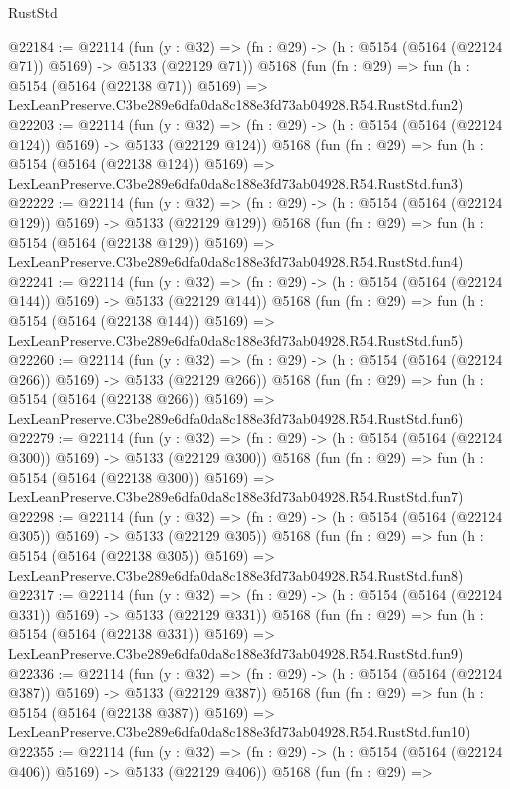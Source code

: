 \begin{lexlean}{RustStd}
\begin{coremodule}
@22184 := @22114
    (fun (y : @32) => (fn : @29) -> (h : @5154 (@5164 (@22124 @71)) @5169) -> @5133 (@22129 @71))
    @5168
    (fun (fn : @29) =>
    fun (h : @5154 (@5164 (@22138 @71)) @5169) =>
    LexLeanPreserve.C3be289e6dfa0da8c188e3fd73ab04928.R54.RustStd.fun2)
@22203 := @22114
    (fun (y : @32) => (fn : @29) -> (h : @5154 (@5164 (@22124 @124)) @5169) -> @5133 (@22129 @124))
    @5168
    (fun (fn : @29) =>
    fun (h : @5154 (@5164 (@22138 @124)) @5169) =>
    LexLeanPreserve.C3be289e6dfa0da8c188e3fd73ab04928.R54.RustStd.fun3)
@22222 := @22114
    (fun (y : @32) => (fn : @29) -> (h : @5154 (@5164 (@22124 @129)) @5169) -> @5133 (@22129 @129))
    @5168
    (fun (fn : @29) =>
    fun (h : @5154 (@5164 (@22138 @129)) @5169) =>
    LexLeanPreserve.C3be289e6dfa0da8c188e3fd73ab04928.R54.RustStd.fun4)
@22241 := @22114
    (fun (y : @32) => (fn : @29) -> (h : @5154 (@5164 (@22124 @144)) @5169) -> @5133 (@22129 @144))
    @5168
    (fun (fn : @29) =>
    fun (h : @5154 (@5164 (@22138 @144)) @5169) =>
    LexLeanPreserve.C3be289e6dfa0da8c188e3fd73ab04928.R54.RustStd.fun5)
@22260 := @22114
    (fun (y : @32) => (fn : @29) -> (h : @5154 (@5164 (@22124 @266)) @5169) -> @5133 (@22129 @266))
    @5168
    (fun (fn : @29) =>
    fun (h : @5154 (@5164 (@22138 @266)) @5169) =>
    LexLeanPreserve.C3be289e6dfa0da8c188e3fd73ab04928.R54.RustStd.fun6)
@22279 := @22114
    (fun (y : @32) => (fn : @29) -> (h : @5154 (@5164 (@22124 @300)) @5169) -> @5133 (@22129 @300))
    @5168
    (fun (fn : @29) =>
    fun (h : @5154 (@5164 (@22138 @300)) @5169) =>
    LexLeanPreserve.C3be289e6dfa0da8c188e3fd73ab04928.R54.RustStd.fun7)
@22298 := @22114
    (fun (y : @32) => (fn : @29) -> (h : @5154 (@5164 (@22124 @305)) @5169) -> @5133 (@22129 @305))
    @5168
    (fun (fn : @29) =>
    fun (h : @5154 (@5164 (@22138 @305)) @5169) =>
    LexLeanPreserve.C3be289e6dfa0da8c188e3fd73ab04928.R54.RustStd.fun8)
@22317 := @22114
    (fun (y : @32) => (fn : @29) -> (h : @5154 (@5164 (@22124 @331)) @5169) -> @5133 (@22129 @331))
    @5168
    (fun (fn : @29) =>
    fun (h : @5154 (@5164 (@22138 @331)) @5169) =>
    LexLeanPreserve.C3be289e6dfa0da8c188e3fd73ab04928.R54.RustStd.fun9)
@22336 := @22114
    (fun (y : @32) => (fn : @29) -> (h : @5154 (@5164 (@22124 @387)) @5169) -> @5133 (@22129 @387))
    @5168
    (fun (fn : @29) =>
    fun (h : @5154 (@5164 (@22138 @387)) @5169) =>
    LexLeanPreserve.C3be289e6dfa0da8c188e3fd73ab04928.R54.RustStd.fun10)
@22355 := @22114
    (fun (y : @32) => (fn : @29) -> (h : @5154 (@5164 (@22124 @406)) @5169) -> @5133 (@22129 @406))
    @5168
    (fun (fn : @29) =>

\end{coremodule}
\end{lexlean}
